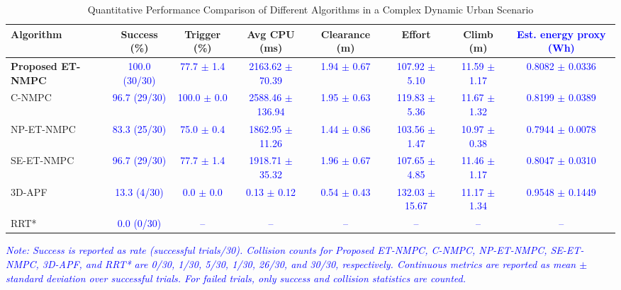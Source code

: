 \documentclass[lettersize,journal]{IEEEtran}
\begin{document}
\begin{table}[t]
	\centering
	\caption{Quantitative Performance Comparison of Different Algorithms in a Complex Dynamic Urban Scenario}
	\label{tab:baseline_comparison}
	\scriptsize
	\setlength{\tabcolsep}{1.5pt}
	\renewcommand{\arraystretch}{1.25} 
	\begin{tabular*}{\textwidth}{@{\extracolsep{\fill}}lccccccc}
		\toprule[1.1pt]
		\textbf{Algorithm} & \textbf{Success (\%)} & \textbf{Trigger (\%)} & \textbf{Avg CPU (ms)} & \textbf{Clearance (m)} & \textbf{Effort} & \textbf{Climb (m)} & \textcolor{blue}{\textbf{Est. energy proxy (Wh)}} \\
		\midrule
		\textbf{Proposed ET-NMPC} & \textcolor{blue}{100.0 (30/30)} & \textcolor{blue}{77.7 $\pm$ 1.4} & \textcolor{blue}{2163.62 $\pm$ 70.39} & \textcolor{blue}{1.94 $\pm$ 0.67} & \textcolor{blue}{107.92 $\pm$ 5.10} & \textcolor{blue}{11.59 $\pm$ 1.17} & \textcolor{blue}{0.8082 $\pm$ 0.0336} \\
		C-NMPC & \textcolor{blue}{96.7 (29/30)} & \textcolor{blue}{100.0 $\pm$ 0.0} & \textcolor{blue}{2588.46 $\pm$ 136.94} & \textcolor{blue}{1.95 $\pm$ 0.63} & \textcolor{blue}{119.83 $\pm$ 5.36} & \textcolor{blue}{11.67 $\pm$ 1.32} & \textcolor{blue}{0.8199 $\pm$ 0.0389} \\
		NP-ET-NMPC & \textcolor{blue}{83.3 (25/30)} & \textcolor{blue}{75.0 $\pm$ 0.4} & \textcolor{blue}{1862.95 $\pm$ 11.26} & \textcolor{blue}{1.44 $\pm$ 0.86} & \textcolor{blue}{103.56 $\pm$ 1.47} & \textcolor{blue}{10.97 $\pm$ 0.38} & \textcolor{blue}{0.7944 $\pm$ 0.0078} \\
		SE-ET-NMPC & \textcolor{blue}{96.7 (29/30)} & \textcolor{blue}{77.7 $\pm$ 1.4} & \textcolor{blue}{1918.71 $\pm$ 35.32} & \textcolor{blue}{1.96 $\pm$ 0.67} & \textcolor{blue}{107.65 $\pm$ 4.85} & \textcolor{blue}{11.46 $\pm$ 1.17} & \textcolor{blue}{0.8047 $\pm$ 0.0310} \\
		3D-APF & \textcolor{blue}{13.3 (4/30)} & \textcolor{blue}{0.0 $\pm$ 0.0} & \textcolor{blue}{0.13 $\pm$ 0.12} & \textcolor{blue}{0.54 $\pm$ 0.43} & \textcolor{blue}{132.03 $\pm$ 15.67} & \textcolor{blue}{11.17 $\pm$ 1.34} & \textcolor{blue}{0.9548 $\pm$ 0.1449} \\
		RRT* & \textcolor{blue}{0.0 (0/30)} & \textcolor{blue}{--} & \textcolor{blue}{--} & \textcolor{blue}{--} & \textcolor{blue}{--} & \textcolor{blue}{--} & \textcolor{blue}{--} \\
		\bottomrule[1.1pt]
	\end{tabular*}
	\smallskip
	\begin{minipage}{\textwidth}
		\footnotesize
		\textcolor{blue}{\textit{Note: Success is reported as rate (successful trials/30). Collision counts for Proposed ET-NMPC, C-NMPC, NP-ET-NMPC, SE-ET-NMPC, 3D-APF, and RRT* are 0/30, 1/30, 5/30, 1/30, 26/30, and 30/30, respectively. Continuous metrics are reported as mean $\pm$ standard deviation over successful trials. For failed trials, only success and collision statistics are counted.}}
	\end{minipage}
\end{table}
\end{document}

